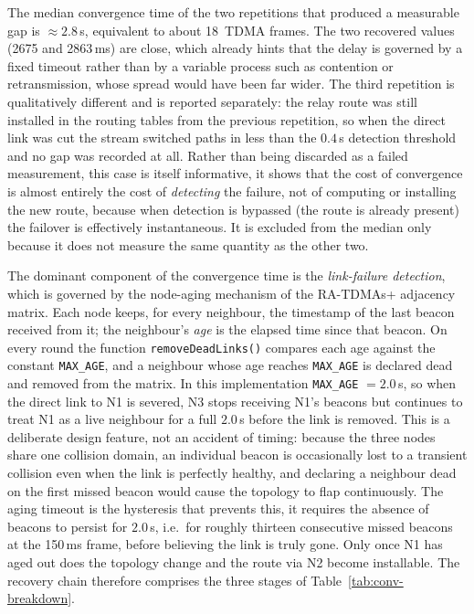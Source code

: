 The median convergence time of the two repetitions that produced a measurable
gap is $\approx 2.8$\,s, equivalent to about 18~TDMA frames. The two
recovered values (2675 and 2863\,ms) are close, which already hints that the
delay is governed by a fixed timeout rather than by a variable process such as
contention or retransmission, whose spread would have been far wider. The third
repetition is qualitatively different and is reported separately: the relay
route was still installed in the routing tables from the previous repetition,
so when the direct link was cut the stream switched paths in less than the
$0.4$\,s detection threshold and no gap was recorded at all. Rather than being
discarded as a failed measurement, this case is itself informative, it shows
that the cost of convergence is almost entirely the cost of \emph{detecting}
the failure, not of computing or installing the new route, because when
detection is bypassed (the route is already present) the failover is effectively
instantaneous. It is excluded from the median only because it does not measure
the same quantity as the other two.

The dominant component of the convergence time is the \emph{link-failure
detection}, which is governed by the node-aging mechanism of the RA-TDMAs+
adjacency matrix. Each node keeps, for every neighbour, the timestamp of the
last beacon received from it; the neighbour's \emph{age} is the elapsed time
since that beacon. On every round the function \texttt{removeDeadLinks()}
compares each age against the constant \texttt{MAX\_AGE}, and a neighbour whose
age reaches \texttt{MAX\_AGE} is declared dead and removed from the matrix. In
this implementation \texttt{MAX\_AGE} $= 2.0$\,s, so when the direct link to N1
is severed, N3 stops receiving N1's beacons but continues to treat N1 as a live
neighbour for a full $2.0$\,s before the link is removed. This is a deliberate
design feature, not an accident of timing: because the three nodes share one
collision domain, an individual beacon is occasionally lost to a transient
collision even when the link is perfectly healthy, and declaring a neighbour
dead on the first missed beacon would cause the topology to flap continuously.
The aging timeout is the hysteresis that prevents this, it requires the
absence of beacons to persist for $2.0$\,s, i.e.\ for roughly thirteen
consecutive missed beacons at the 150\,ms frame, before believing the link is
truly gone. Only once N1 has aged out does the topology change and the route via
N2 become installable. The recovery chain therefore comprises the three stages
of Table~\ref{tab:conv-breakdown}.

